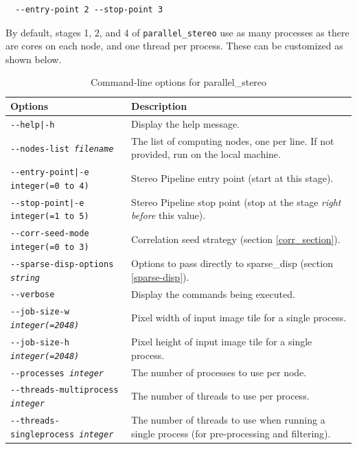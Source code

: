 \begin{verbatim}
  --entry-point 2 --stop-point 3
\end{verbatim}

By default, stages 1, 2, and 4 of \texttt{parallel\_stereo} use
as many processes as there are cores on each node, and one thread per process.
These can be customized as shown below.

\begin{longtable}{|l|p{7.5cm}|}
\caption{Command-line options for parallel\_stereo}
\label{tbl:parallelstereo}
\endfirsthead
\endhead
\endfoot
\endlastfoot
\hline
Options & Description \\ \hline \hline
\texttt{-\/-help|-h} & Display the help message.\\ \hline
\texttt{-\/-nodes-list \textit{filename} } & The list of computing nodes,
one per line. If not provided, run on the local machine. \\ \hline
\texttt{-\/-entry-point|-e integer(=0 to 4)} & Stereo Pipeline entry
point (start at this stage). \\ \hline
\texttt{-\/-stop-point|-e integer(=1 to 5)} & Stereo Pipeline stop point
(stop at the stage {\it right before} this value). \\ \hline
\texttt{-\/-corr-seed-mode integer(=0 to 3)} & Correlation seed strategy
(section \ref{corr_section}). \\ \hline
\texttt{-\/-sparse-disp-options \textit{string} } & Options to pass directly
to sparse\_disp (section \ref{sparse-disp}). \\ \hline
\texttt{-\/-verbose } & Display the commands being executed. \\ \hline
\texttt{-\/-job-size-w \textit{integer(=2048)}} & Pixel width of input
image tile for a single process. \\ \hline
\texttt{-\/-job-size-h \textit{integer(=2048)}} & Pixel height of input
image tile for a single process. \\ \hline
\texttt{-\/-processes \textit{integer}} & The number of processes to use per node. \\ \hline
\texttt{-\/-threads-multiprocess \textit{integer}} & The number of threads to use per process.\\ \hline
\texttt{-\/-threads-singleprocess \textit{integer}} & The number of threads to use when running a single process (for pre-processing and filtering).\\ \hline
\end{longtable}

